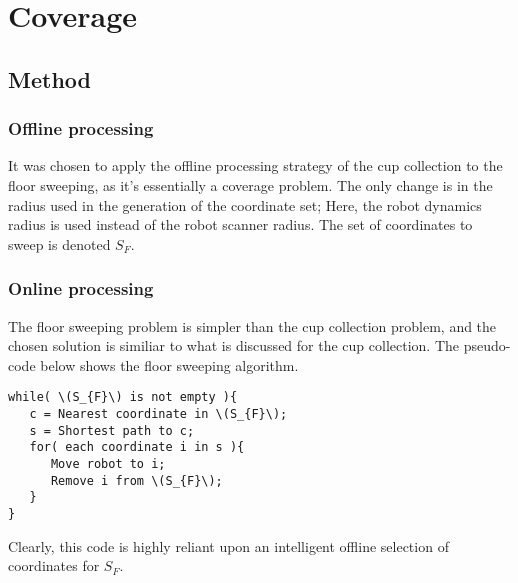\section{Coverage}
\subsection{Method}
\subsubsection{Offline processing}
It was chosen to apply the offline processing strategy of the cup collection
to the floor sweeping, as it's essentially a coverage problem.
The only change is in the radius used in the generation of the coordinate set;
Here, the robot dynamics radius is used instead of the robot scanner radius.
The set of coordinates to sweep is denoted \(S_{F}\).


\subsubsection{Online processing}
The floor sweeping problem is simpler than the cup collection problem,
and the chosen solution is similiar to what is discussed for the cup collection.
The pseudo-code below shows the floor sweeping algorithm.

\begin{verbatim}
while( \(S_{F}\) is not empty ){
   c = Nearest coordinate in \(S_{F}\);
   s = Shortest path to c;
   for( each coordinate i in s ){
      Move robot to i;
      Remove i from \(S_{F}\);
   }
}
\end{verbatim}

Clearly, this code is highly reliant upon an intelligent offline selection of coordinates for \(S_{F}\).